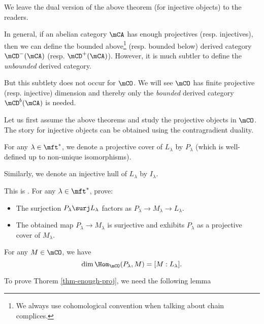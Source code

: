 	\begin{rem}
		We leave the dual version of the above theorem (for injective objects) to the readers.
	\end{rem}

	\begin{rem}
		In general, if an abelian category $\mCA$ has enough projectives (resp. injectives), then we can define the bounded above\footnote{We always use cohomological convention when talking about chain complices.} (resp. bounded below) derived category $\mCD^-(\mCA)$ (resp. $\mCD^+(\mCA)$). However, it is much subtler to define the \emph{unbounded} derived category.

		But this subtlety does not occur for $\mCO$. We will see $\mCO$ has finite projective (resp. injective) dimension and thereby only the \emph{bounded} derived category $\mCD^b(\mCA)$ is needed.

	\end{rem}

	Let us first assume the above theorems and study the projective objects in $\mCO$. The story for injective objects can be obtained using the contragradient duality.

	\begin{notn}
		For any $\lambda\in \mft^*$, we denote a projective cover of $L_\lambda$ by $P_\lambda$ (which is well-defined up to non-unique isomorphisms).

		Similarly, we denote an injective hull of $L_\lambda$ by $I_\lambda$.
	\end{notn}


	\begin{exe}
		This is . For any $\lambda\in \mft^*$, prove:
		\begin{itemize}
			\item[(1)] 
				The surjection $P_\lambda \surj L_\lambda$ factors as $P_\lambda\to M_\lambda \to L_\lambda$.
			\item[(2)]
				The obtained map $P_\lambda \to M_\lambda$ is surjective and exhibits $P_\lambda$ as a projective cover of $M_\lambda$.
		\end{itemize}
	\end{exe}

	\begin{cor}
		\label{cor-BGG-pre}
		For any $M\in \mCO$, we have
		\[
			\dim \Hom_\mCO(P_\lambda,M) = [M:L_\lambda].
		\]
	\end{cor}

	To prove Thorem \ref{thm-enough-proj}, we need the following lemma

